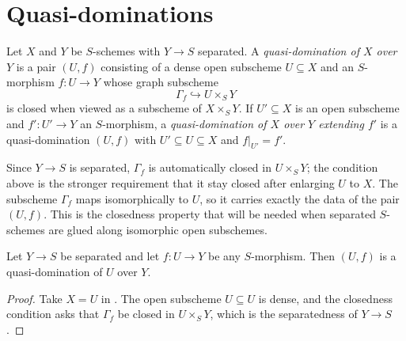 \section{Quasi-dominations}

\begin{definition}
  \label{def:nagata-conrad-quasi-domination}
  \leanok

  Let $X$ and $Y$ be $S$-schemes with $Y\to S$ separated.  A
  \emph{quasi-domination of $X$ over $Y$} is a pair $(U,f)$ consisting of a
  dense open subscheme $U\subseteq X$ and an $S$-morphism $f\colon U\to Y$
  whose graph subscheme
  \[
    \Gamma_f\hookrightarrow U\times_SY
  \]
  is closed when viewed as a subscheme of $X\times_SY$.  If $U'\subseteq X$ is
  an open subscheme and $f'\colon U'\to Y$ an $S$-morphism, a
  \emph{quasi-domination of $X$ over $Y$ extending $f'$} is a quasi-domination
  $(U,f)$ with $U'\subseteq U\subseteq X$ and $f|_{U'}=f'$.
\end{definition}

Since $Y\to S$ is separated, $\Gamma_f$ is automatically closed in
$U\times_SY$; the condition above is the stronger requirement that it stay
closed after enlarging $U$ to $X$.  The subscheme $\Gamma_f$ maps
isomorphically to $U$, so it carries exactly the data of the pair $(U,f)$.
This is the closedness property that will be needed when separated $S$-schemes
are glued along isomorphic open subschemes.

\begin{lemma}
  \label{lemma:nagata-conrad-morphism-is-quasi-domination}
  \leanok

  Let $Y\to S$ be separated and let $f\colon U\to Y$ be any $S$-morphism.
  Then $(U,f)$ is a quasi-domination of $U$ over $Y$.
\end{lemma}

\begin{proof}
  \leanok
  Take $X=U$ in .  The open
  subscheme $U\subseteq U$ is dense, and the closedness condition asks that
  $\Gamma_f$ be closed in $U\times_SY$, which is the separatedness of
  $Y\to S$.
\end{proof}

